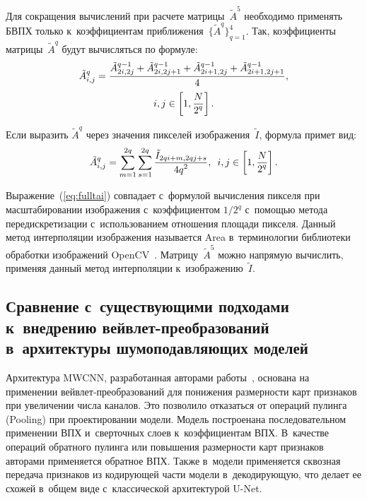 \begin{multicols}{2}
Для сокращения вычислений при расчете мат\-ри\-цы~$\tilde{A}^5$ необходимо применять 
БВПХ только к~коэффициентам приближения~$\{\tilde{A}^q\}_{q=1}^4$. Так, 
коэффициенты матрицы~$\tilde{A}^q$ будут вычисляться по формуле:
\begin{multline*}
\tilde{A}_{i,j}^q = \displaystyle\frac{\displaystyle \tilde{A}_{2i, 2j}^{q-1} + \tilde{A}_{2i, 2j+1}^{q-1} + 
\tilde{A}_{2i+1, 2j}^{q-1} + \tilde{A}_{2i+1, 2j+1}^{q-1}\mathstrut}{\displaystyle 4\mathstrut},\\
 i,j \in \left[1, \displaystyle\frac{\displaystyle N\mathstrut}{\displaystyle 2^q\mathstrut}\right].
\end{multline*}

Если выразить $\tilde{A}^q$ через значения пикселей изоб\-ра\-же\-ния~$\tilde{I}$, 
формула примет вид:
\begin{equation}
\label{eq:fulltai}
\tilde{A}_{i,j}^q = \sum\limits_{m=1}^{2q}\sum\limits_{s=1}^{2q}\displaystyle\frac{\displaystyle \tilde{I}_{2qi+m, 
2qj+s}\mathstrut}{\displaystyle 4q^2\mathstrut},\enskip i,j \in \left[1, \displaystyle\frac{\displaystyle N\mathstrut}{\displaystyle 2^q\mathstrut}\right].
\end{equation}

Выражение~(\ref{eq:fulltai}) совпадает с~формулой вычисления пикселя при 
масштабировании изображения с~коэффициентом ${1}/{2^q}$ с~по\-мощью метода 
передискретизации с~использованием отношения площади пикселя. Данный метод 
интерполяции изображения называется {Area} в~терминологии библиотеки 
обработки изображений OpenCV~\cite{OPENCV_LIB}. Матрицу~$\tilde{A}^5$ можно 
напрямую вычислить, применяя данный метод интерполяции к~изображению~$\tilde{I}$.


\subsection{Сравнение с~существующими подходами к~внедрению вейвлет-преобразований в~архитектуры шумоподавляющих моделей}

Архитектура MWCNN, разработанная авторами 
работы~\cite{MWCNN}, основана на применении вейв\-лет-пре\-обра\-зо\-ва\-ний для понижения 
размерности карт признаков при увеличении числа каналов. Это позволило 
отказаться от операций пулинга (Pooling) при проектировании модели. Модель 
построена\linebreak на последовательном применении ВПХ и~сверточных слоев к~коэффициентам 
ВПХ. В~качестве операций обратного пулинга или повышения раз\-мер\-ности карт 
признаков авторами применяется \mbox{обратное} ВПХ. Также в~модели применяется сквозная 
передача признаков из кодирующей части модели в~декодирующую, что делает ее 
схожей в~общем виде с~классической архитектурой U-Net.


\end{multicols}
